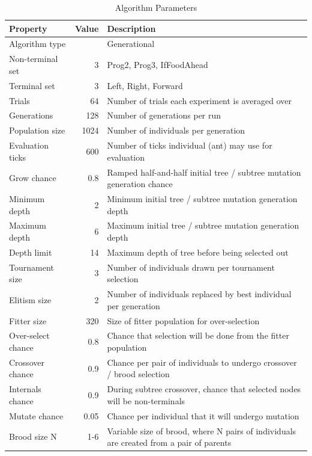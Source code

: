 \documentclass{acm_proc_article-sp}
\begin{document}
\begin{table}
\centering
\caption{Algorithm Parameters}
\begin{tabular}{lrl}
Property & Value & Description\\
\hline
Algorithm type &  & Generational\\
Non-terminal set & 3 & Prog2, Prog3, IfFoodAhead\\
Terminal set & 3 & Left, Right, Forward\\
Trials & 64 & Number of trials each experiment is averaged over\\
Generations & 128 & Number of generations per run\\
Population size & 1024 & Number of individuals per generation\\
Evaluation ticks & 600 & Number of ticks individual (ant) may use for evaluation\\
Grow chance & 0.8 & Ramped half-and-half initial tree / subtree mutation generation chance\\
Minimum depth & 2 & Minimum initial tree / subtree mutation generation depth\\
Maximum depth & 6 & Maximum initial tree / subtree mutation generation depth\\
Depth limit & 14 & Maximum depth of tree before being selected out\\
Tournament size & 3 & Number of individuals drawn per tournament selection\\
Elitism size & 2 & Number of individuals replaced by best individual per generation\\
Fitter size & 320 & Size of fitter population for over-selection\\
Over-select chance & 0.8 & Chance that selection will be done from the fitter population\\
Crossover chance & 0.9 & Chance per pair of individuals to undergo crossover / brood selection\\
Internals chance & 0.9 & During subtree crossover, chance that selected nodes will be non-terminals\\
Mutate chance & 0.05 & Chance per individual that it will undergo mutation\\
Brood size N & 1-6 & Variable size of brood, where N pairs of individuals are created from a pair of parents\\
\end{tabular}
\end{table}
\end{document}
